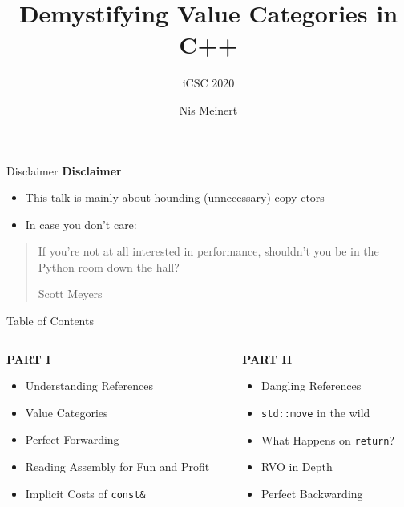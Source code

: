\documentclass[compress,aspectratio=1610]{beamer}
\title{Demystifying Value Categories in C++}
\subtitle{iCSC 2020}
\institute{Rostock University}
\author{Nis Meinert}
\date{}
\begin{document}
\maketitle

\begin{frame}{Disclaimer}
    \textbf{Disclaimer} 
    \begin{itemize}
        \item This talk is mainly about hounding (unnecessary) copy ctors
        \item In case you don't care:
    \end{itemize}

    \blockquote[Scott Meyers]{If you’re not at all interested in performance, shouldn’t you be in the Python room down the hall?}
\end{frame}

\begin{frame}{Table of Contents}
    \begin{columns}[t]
        \begin{column}{.4\textwidth}
            \textbf{PART I}
            \begin{itemize}
                \item Understanding References
                \item Value Categories
                \item Perfect Forwarding
                \item Reading Assembly for Fun and Profit
                \item Implicit Costs of \texttt{const\&}
            \end{itemize}
        \end{column}
        \begin{column}{.4\textwidth}
            \textbf{PART II}
            \begin{itemize}
                \item Dangling References
                \item \texttt{std::move} in the wild
                \item What Happens on \texttt{return}?
                \item RVO in Depth
                \item Perfect Backwarding
            \end{itemize}
        \end{column}
    \end{columns}
\end{frame}

\end{document}
